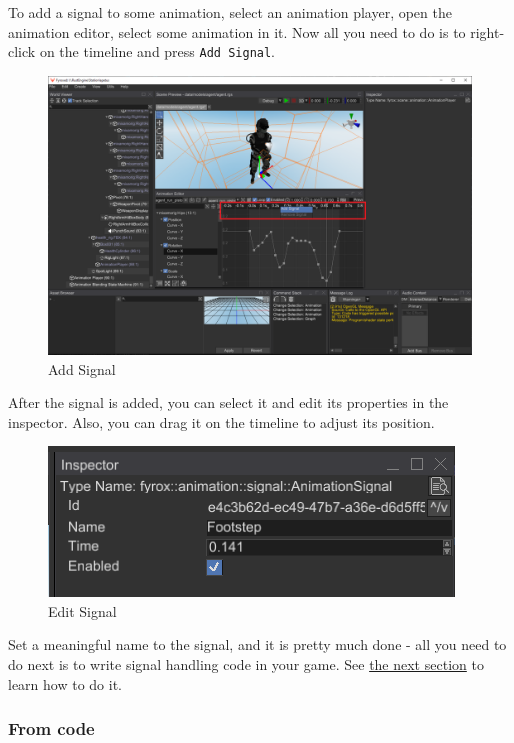 \documentclass[
]{book}
\theoremstyle{definition}
\theoremstyle{definition}
\theoremstyle{definition}
\theoremstyle{definition}
\theoremstyle{remark}
\begin{document}
To add a signal to some animation, select an animation player, open the animation editor, select some animation in it. Now all you need to do is to right-click on the timeline and press \texttt{Add\ Signal}.

\begin{figure}
\centering
\includegraphics{images/animation/signal_add.png}
\caption{Add Signal}
\end{figure}

After the signal is added, you can select it and edit its properties in the inspector. Also, you can drag it on the timeline to adjust its position.

\begin{figure}
\centering
\includegraphics{images/animation/signal_edit.png}
\caption{Edit Signal}
\end{figure}

Set a meaningful name to the signal, and it is pretty much done - all you need to do next is to write signal handling code in your game. See \hyperref[reacting-to-signal-events]{the next section} to learn how to do it.

\subsubsection{From code}\label{from-code-3}
\end{document}

